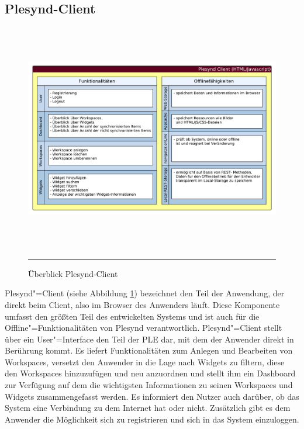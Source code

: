 \subsection{Plesynd-Client}
\begin{figure}
  \centering
  \includegraphics[height=10cm,keepaspectratio]{./Figures/konzeptionelle_loesung_plesynd_client.pdf}
    \rule{35em}{0.5pt}
  \caption[Überblick Plesynd-Client]{Überblick Plesynd-Client}
  \label{fig:ueberblick_plesynd_client}
\end{figure}
Plesynd"=Client (siehe Abbildung \ref{fig:ueberblick_plesynd_client}) bezeichnet den Teil der Anwendung, der direkt beim Client, also im Browser des Anwenders läuft. Diese Komponente umfasst den größten Teil des entwickelten Systems und ist auch für die Offline"=Funktionalitäten von Plesynd verantwortlich. Plesynd"=Client stellt über ein User"=Interface den Teil der PLE dar, mit dem der Anwender direkt in Berührung kommt. Es liefert Funktionalitäten zum Anlegen und Bearbeiten von Workspaces, versetzt den Anwender in die Lage nach Widgets zu filtern, diese den Workspaces hinzuzufügen und neu anzuordnen und stellt ihm ein Dashboard zur Verfügung auf dem die wichtigsten Informationen zu seinen Workspaces und Widgets zusammengefasst werden. Es informiert den Nutzer auch darüber, ob das System eine Verbindung zu dem Internet hat oder nicht. Zusätzlich gibt es dem Anwender die Möglichkeit sich zu registrieren und sich in das System einzuloggen. 


